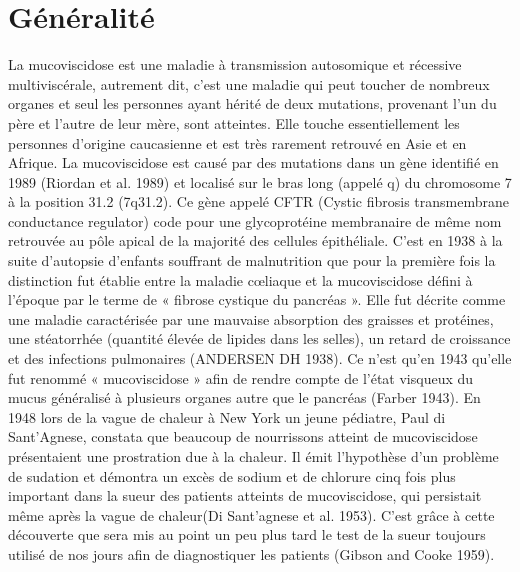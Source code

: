 
\chapter{Généralité} %


\label{ch:02-01} %



La mucoviscidose est une maladie à transmission autosomique et récessive multiviscérale, autrement dit, c’est une maladie qui peut toucher de nombreux organes et seul les personnes ayant hérité de deux mutations, provenant l’un du père et l’autre de leur mère, sont atteintes. Elle touche essentiellement les personnes d’origine caucasienne et est très rarement retrouvé en Asie et en Afrique. La mucoviscidose est causé par des mutations dans un gène identifié en 1989 (Riordan et al. 1989)\cite{riordan_identification_1989} et localisé sur le bras long (appelé q) du chromosome 7 à la position 31.2 (7q31.2). Ce gène appelé CFTR (Cystic fibrosis transmembrane conductance regulator) code pour une glycoprotéine membranaire de même nom retrouvée au pôle apical de la majorité des cellules épithéliale. 
C’est en 1938 à la suite d’autopsie d’enfants souffrant de malnutrition que pour la première fois la distinction fut établie entre la maladie cœliaque et la mucoviscidose défini à l’époque par le terme de « fibrose cystique du pancréas ». Elle fut décrite comme une maladie caractérisée par une mauvaise absorption des graisses et protéines, une stéatorrhée (quantité élevée de lipides dans les selles), un retard de croissance et des infections pulmonaires (ANDERSEN DH 1938)\cite{andersen_dh_cystic_1938}. Ce n’est qu’en 1943 qu’elle fut renommé « mucoviscidose » afin de rendre compte de l’état visqueux du mucus généralisé à plusieurs organes autre que le pancréas (Farber 1943)\cite{farber_pancreatic_1943}. En 1948 lors de la vague de chaleur à New York un jeune pédiatre, Paul di Sant'Agnese, constata que beaucoup de nourrissons atteint de mucoviscidose présentaient une prostration due à la chaleur. Il émit l’hypothèse d’un problème de sudation et démontra un excès de sodium et de chlorure cinq fois plus important dans la sueur des patients atteints de mucoviscidose, qui persistait même après la vague de chaleur(Di Sant’agnese et al. 1953)\cite{di_santagnese_abnormal_1953}. C’est grâce à cette découverte que sera mis au point un peu plus tard le test de la sueur toujours utilisé de nos jours afin de diagnostiquer les patients (Gibson and Cooke 1959)\cite{gibson_test_1959}.
